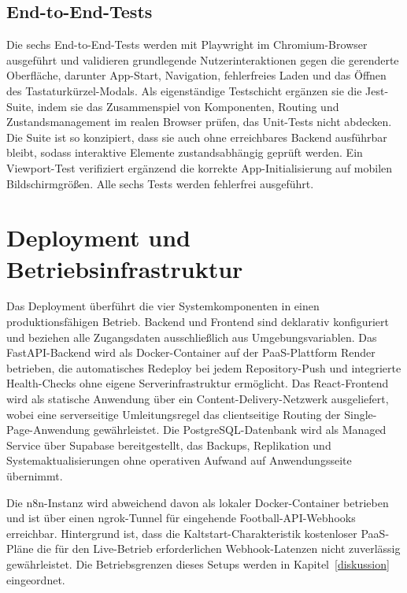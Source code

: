 \subsection{End-to-End-Tests}\label{impl-e2e-tests}

Die sechs End-to-End-Tests werden mit Playwright im Chromium-Browser ausgeführt und validieren grundlegende Nutzerinteraktionen gegen die gerenderte Oberfläche, darunter App-Start, Navigation, fehlerfreies Laden und das Öffnen des Tastaturkürzel-Modals. Als eigenständige Testschicht ergänzen sie die Jest-Suite, indem sie das Zusammenspiel von Komponenten, Routing und Zustandsmanagement im realen Browser prüfen, das Unit-Tests nicht abdecken. Die Suite ist so konzipiert, dass sie auch ohne erreichbares Backend ausführbar bleibt, sodass interaktive Elemente zustandsabhängig geprüft werden. Ein Viewport-Test verifiziert ergänzend die korrekte App-Initialisierung auf mobilen Bildschirmgrößen. Alle sechs Tests werden fehlerfrei ausgeführt.


\section{Deployment und Betriebsinfrastruktur}\label{deployment}

Das Deployment überführt die vier Systemkomponenten in einen produktionsfähigen Betrieb. Backend und Frontend sind deklarativ konfiguriert und beziehen alle Zugangsdaten ausschließlich aus Umgebungsvariablen. Das FastAPI-Backend wird als Docker-Container auf der PaaS-Plattform Render betrieben, die automatisches Redeploy bei jedem Repository-Push und integrierte Health-Checks ohne eigene Serverinfrastruktur ermöglicht. Das React-Frontend wird als statische Anwendung über ein Content-Delivery-Netzwerk ausgeliefert, wobei eine serverseitige Umleitungsregel das clientseitige Routing der Single-Page-Anwendung gewährleistet. Die PostgreSQL-Datenbank wird als Managed Service über Supabase bereitgestellt, das Backups, Replikation und Systemaktualisierungen ohne operativen Aufwand auf Anwendungsseite übernimmt.

Die n8n-Instanz wird abweichend davon als lokaler Docker-Container betrieben und ist über einen ngrok-Tunnel für eingehende Football-API-Webhooks erreichbar. Hintergrund ist, dass die Kaltstart-Charakteristik kostenloser PaaS-Pläne die für den Live-Betrieb erforderlichen Webhook-Latenzen nicht zuverlässig gewährleistet. Die Betriebsgrenzen dieses Setups werden in Kapitel~\ref{diskussion} eingeordnet.